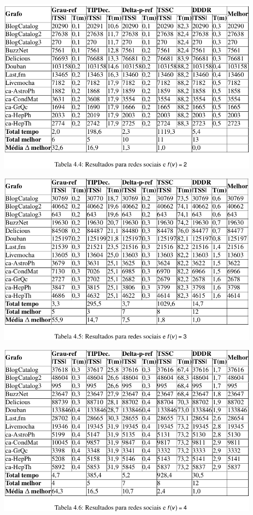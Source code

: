 \documentclass{beamer}
\begin{document}
\begin{frame}
\includegraphics[scale=0.3]{img/k2.png}
\end{frame}

\begin{frame}
\includegraphics[scale=0.3]{img/k3.png} 
\end{frame}

\begin{frame}
\includegraphics[scale=0.3]{img/k4.png}
\end{frame}
\end{document}
